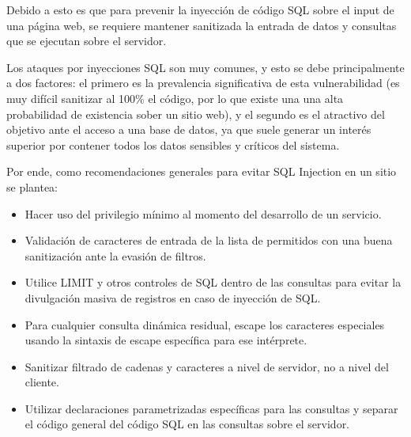 \documentclass[12pt,oneside,a4paper]{book}
\begin{document}
\begin{enumerate}
\begin{itemize}
\vspace{1em}

\hspace{20pt}
Debido a esto es que para prevenir la inyección de código SQL sobre el input de una página web, se requiere mantener sanitizada la entrada de datos y consultas que se ejecutan sobre el servidor.

\vspace{1em}

\hspace{20pt}
Los ataques por inyecciones SQL son muy comunes, y esto se debe principalmente a dos factores: el primero es la prevalencia significativa de esta vulnerabilidad (es muy difícil sanitizar al 100\% el código, por lo que existe una una alta probabilidad de existencia sober un sitio web), y el segundo es el atractivo del objetivo ante el acceso a una base de datos, ya que suele generar un interés superior por contener todos los datos sensibles y críticos del sistema.

\vspace{1em}

\hspace{20pt}
Por ende, como recomendaciones generales para evitar SQL Injection en un sitio se plantea: 

\vspace{1em}

\begin{itemize}
	\item Hacer uso del privilegio mínimo al momento del desarrollo de un servicio.
	\item Validación de caracteres de entrada de la lista de permitidos con una buena sanitización ante la evasión de filtros.
	\item  Utilice LIMIT y otros controles de SQL dentro de las consultas para evitar la divulgación masiva de registros en caso de inyección de SQL.
	\item Para cualquier consulta dinámica residual, escape los caracteres especiales usando la sintaxis de escape específica para ese intérprete.
	\item Sanitizar filtrado de cadenas y caracteres a nivel de servidor, no a nivel del cliente.
	\item Utilizar declaraciones parametrizadas específicas para las consultas y separar el código general del código SQL en las consultas sobre el servidor.
\end{itemize}
\end{itemize}


\end{enumerate}
\end{document}
